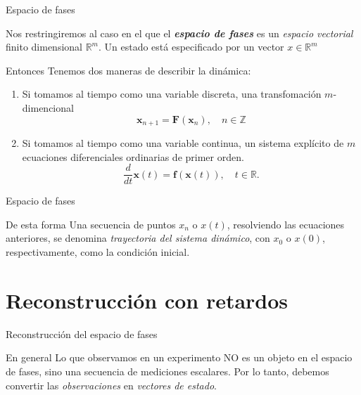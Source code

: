 \documentclass[11pt]{beamer}
\begin{document}
\begin{frame}{Espacio de fases}
	\begin{small}
	Nos restringiremos al caso en el que el \textbf{\textit{espacio de fases}} es un \textit{espacio vectorial} finito dimensional $\mathbb{R}^m$.
	Un estado está especificado por un vector $x\in \mathbb{R}^m$
	
	\begin{block}{Entonces}
		Tenemos dos maneras de describir la dinámica:
		\begin{enumerate}
			\item Si tomamos al tiempo como una variable discreta, una transfomación $m$-dimencional
			\begin{equation}
			\mathbf{x}_{n+1} = \mathbf{F}(\mathbf{x}_n), \quad n \in \mathbb{Z}
			\end{equation}
			
			\item Si tomamos al tiempo como una variable continua, un sistema explícito de $m$ ecuaciones diferenciales ordinarias de primer orden.
			\begin{equation}
			\frac{d}{dt}\mathbf{x}(t) = \mathbf{f}(\mathbf{x}(t)), \quad t \in \mathbb{R}.
			\end{equation}
		\end{enumerate}
	\end{block}
	\end{small}
\end{frame}

\begin{frame}{Espacio de fases}
	\begin{block}{De esta forma}
	Una secuencia de puntos $x_n$ o $x(t)$, resolviendo las ecuaciones anteriores, se denomina \textit{trayectoria del sistema dinámico}, con $x_0$ o $x(0)$, respectivamente, como la condición inicial.
	
	\end{block}
\end{frame}

\section{Reconstrucción con retardos}
\begin{frame} 
\tableofcontents[currentsection] %
\end{frame}


\begin{frame}{Reconstrucción del espacio de fases}
	\begin{block}{En general}
		Lo que observamos en un experimento NO es un objeto en el espacio de fases, sino una secuencia de mediciones escalares. Por lo tanto, debemos convertir las \textit{observaciones} en \textit{vectores de estado}.
	\end{block}
\end{frame}
\end{document}
